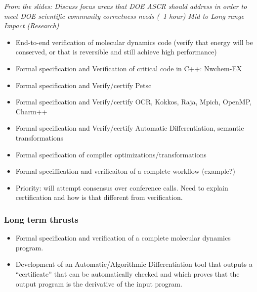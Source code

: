 {\small\em From the slides:
Discuss focus areas that DOE ASCR should address in order to meet  DOE 	scientific community correctness needs (~1 hour)
Mid to Long range Impact (Research)}

\begin{itemize}
\item 
End-to-end verification of molecular dynamics code (verify that energy will be conserved, or that is reversible and still achieve high performance)

\item Formal specification and Verification of  critical code in C++: Nwchem-EX 

\item Formal specification and Verify/certify Petsc

\item Formal specification and Verify/certify OCR, Kokkos, Raja, Mpich, OpenMP, Charm++

\item Formal specification and Verify/certify  Automatic Differentiation, semantic transformations

\item Formal specification of compiler optimizations/transformations

\item Formal speciffication and verificaiton of a complete workflow (example?)


\item Priority: will attempt consensus over conference calls. Need to explain certification and how is that different from verification.
\end{itemize}

\subsubsection{Long term thrusts}
 
\begin{itemize}
\item Formal specification and verification of a complete molecular dynamics program.

\item Development of an Automatic/Algorithmic Differentiation tool that outputs a “certificate”  that can be automatically checked and which proves that the output program is the derivative of the input program. 

\end{itemize}
 
 \fi

